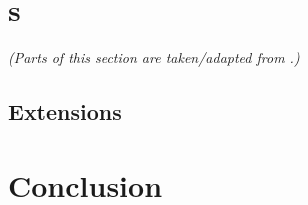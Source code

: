 \documentclass{article}
\begin{document}
\section{{\HCWL}s}\label{sec:hcwl}
\textit{(Parts of this section are taken/adapted from \cite{GGJLM24}.)}











\subsection{Extensions}


\section{Conclusion}

{\small


}
\end{document}
